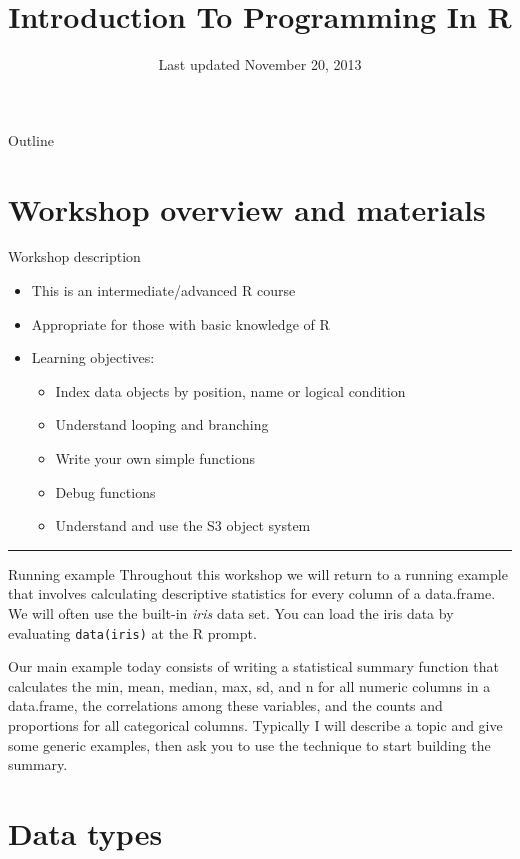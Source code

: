 \documentclass[table,smaller]{beamer}
\author{}
\date{Last updated November 20, 2013}
\title{Introduction To Programming In R}
\begin{document}
\maketitle
\begin{frame}{Outline}
\tableofcontents
\end{frame}



\section{Workshop overview and materials}
\label{sec-1}

\begin{frame}[label=sec-1-1]{Workshop description}
\begin{itemize}
\item This is an intermediate/advanced R course
\item Appropriate for those with basic knowledge of R
\item Learning objectives:
\begin{itemize}
\item Index data objects by position, name or logical condition
\item Understand looping and branching
\item Write your own simple functions
\item Debug functions
\item Understand and use the S3 object system
\end{itemize}
\end{itemize}

\rule{\linewidth}{0.5pt}
\end{frame}
\begin{frame}[fragile,label=sec-1-2]{Running example}
 Throughout this workshop we will return to a running example that involves calculating descriptive statistics for every column of a data.frame. We will often use the built-in \emph{iris} data set. You can load the iris data by evaluating \texttt{data(iris)} at the R prompt.

Our main example today consists of writing a statistical summary function that calculates the min, mean, median, max, sd, and n for all numeric columns in a data.frame, the correlations among these variables, and the counts and proportions for all categorical columns. Typically I will describe a topic and give some generic examples, then ask you to use the technique to start building the summary.
\end{frame}
\section{Data types}
\label{sec-2}
\end{document}
